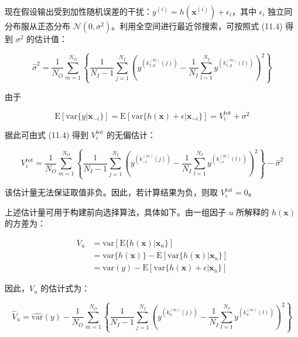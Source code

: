 \documentclass{ctexart}
\begin{document}
现在假设输出受到加性随机误差的干扰：$y^{(i)}=h(\boldsymbol{x}^{(i)})+\epsilon_i$，其中 $\epsilon_i$ 独立同分布服从正态分布 $\mathcal{N}(0,\sigma^2)$。利用全空间进行最近邻搜索，可按照式 (11.4) 得到 $\sigma^2$ 的估计值：

\begin{equation*}
\widehat{\sigma}^2=\frac{1}{N_O}\sum_{m=1}^{N_O}\left\{\frac{1}{N_I-1}\sum_{j=1}^{N_I}\left(y^{(k^{(m)}_{1:p}(j))}-\frac{1}{N_I}\sum_{l=1}^{N_I}y^{(k^{(m)}_{1:p}(l))}
\right)^2\right\}
\tag{11.5}
\end{equation*}

由于

\begin{equation*}
\mathrm{E}[\mathrm{var}\{y|\boldsymbol{x}_{\sim i}\}]=\mathrm{E}[\mathrm{var}\{h(\boldsymbol{x})+\epsilon|\boldsymbol{x}_{\sim i}\}]=V_i^{\mathrm{tot}}+\sigma^2
\end{equation*}

据此可由式 (11.4) 得到 $V_i^{\mathrm{tot}}$ 的无偏估计：

\begin{equation*}
V_i^{\mathrm{tot}}=\frac{1}{N_O}\sum_{m=1}^{N_O}\left\{\frac{1}{N_I-1}\sum_{j=1}^{N_I}\left(y^{(k^{(m)}_{\sim i}(j))}-\frac{1}{N_I}\sum_{l=1}^{N_I}y^{(k^{(m)}_{\sim i}(l))}\right)^2\right\}-\widehat{\sigma}^2
\tag{11.6}
\end{equation*}

该估计量无法保证取值非负。因此，若计算结果为负，则取 $V_i^{\mathrm{tot}}=0$。

上述估计量可用于构建前向选择算法，具体如下。由一组因子 $u$ 所解释的 $h(\boldsymbol{x})$ 的方差为：

\begin{align*}
V_{u}&=\mathrm{var}[\mathrm{E}\{h(\boldsymbol{x})|\boldsymbol{x}_{u}\}]\\
&=\mathrm{var}\{h(\boldsymbol{x})\}-\mathrm{E}[\mathrm{var}\{h(\boldsymbol{x})|\boldsymbol{x}_{u}\}]\\
&=\mathrm{var}(y)-\mathrm{E}[\mathrm{var}\{h(\boldsymbol{x})+\epsilon|\boldsymbol{x}_{u}\}]
\end{align*}

因此，$V_{u}$ 的估计式为：

\begin{equation*}
\widehat{V}_{u}=\widehat{\mathrm{var}}(y)-\frac{1}{N_O}\sum_{m=1}^{N_O}\left\{\frac{1}{N_I-1}\sum_{j=1}^{N_I}\left(y^{(k_{u}^{(m)}(j))}-\frac{1}{N_I}\sum_{l=1}^{N_I}y^{(k_{u}^{(m)}(l))}\right)^2\right\}
\tag{11.7}
\end{equation*}
\end{document}
